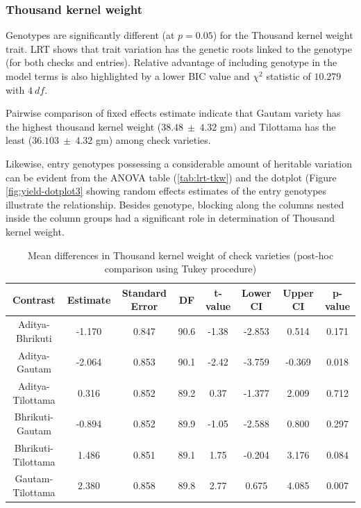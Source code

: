 \documentclass[12pt,oneside]{dukestatscithesis} %
\theoremstyle{definition}
\theoremstyle{definition}
\theoremstyle{definition}
\theoremstyle{remark}
\begin{document}
\subsubsection{Thousand kernel weight}\label{thousand-kernel-weight}

Genotypes are significantly different (at \(p = 0.05\)) for the Thousand
kernel weight trait. LRT shows that trait variation has the genetic
roots linked to the genotype (for both checks and entries). Relative
advantage of including genotype in the model terms is also highlighted
by a lower BIC value and \(\chi^2\) statistic of \(10.279\) with
\(4\ df\).

Pairwise comparison of fixed effects estimate indicate that Gautam
variety has the highest thousand kernel weight (\(38.48\ \pm\ 4.32\) gm)
and Tilottama has the least (\(36.103\ \pm\ 4.32\) gm) among check
varieties.

Likewise, entry genotypes possessing a considerable amount of heritable
variation can be evident from the ANOVA table (\ref{tab:lrt-tkw}) and
the dotplot (Figure \ref{fig:yield-dotplot3} showing random effects
estimates of the entry genotypes illustrate the relationship. Besides
genotype, blocking along the columns nested inside the column groups had
a significant role in determination of Thousand kernel weight.
\begin{table}[H]

\caption{\label{tab:yield-meanconf-tab3}Mean differences in Thousand kernel weight of check varieties (post-hoc comparison using Tukey procedure)}
\centering
\begin{tabular}[t]{cccccccc}
\toprule
Contrast & Estimate & Standard Error & DF & t-value & Lower CI & Upper CI & p-value\\
\midrule
Aditya-Bhrikuti & -1.170 & 0.847 & 90.6 & -1.38 & -2.853 & 0.514 & 0.171\\
Aditya-Gautam & -2.064 & 0.853 & 90.1 & -2.42 & -3.759 & -0.369 & 0.018\\
Aditya-Tilottama & 0.316 & 0.852 & 89.2 & 0.37 & -1.377 & 2.009 & 0.712\\
Bhrikuti-Gautam & -0.894 & 0.852 & 89.9 & -1.05 & -2.588 & 0.800 & 0.297\\
Bhrikuti-Tilottama & 1.486 & 0.851 & 89.1 & 1.75 & -0.204 & 3.176 & 0.084\\
Gautam-Tilottama & 2.380 & 0.858 & 89.8 & 2.77 & 0.675 & 4.085 & 0.007\\
\bottomrule
\end{tabular}
\end{table}
\end{document}
